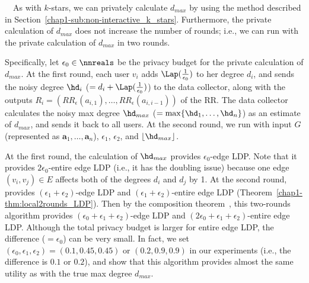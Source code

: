 \smallskip
{}~~As with $k$-stars, we can privately calculate $d_{max}$ 
by using the method described in Section~\ref{chap1-sub:non-interactive_k_stars}. 
Furthermore, the private calculation of $d_{max}$ does not increase the number of rounds; i.e., we can run  with the private calculation of $d_{max}$ in two rounds. 

Specifically, let $\epsilon_0 \in \nnreals$ be the privacy budget for the private calculation of $d_{max}$. 
At the first round, each user $v_i$ adds $\Lap(\frac{1}{\epsilon_0})$ to her degree $d_i$, 
and sends the noisy degree $\hd_i$ ($=d_i + \Lap(\frac{1}{\epsilon_0})$) to the data collector, along with the outputs $R_i = (RR_\epsilon(a_{i,1}), \ldots, RR_\epsilon(a_{i,i-1}))$ of the RR. 
The data collector calculates the noisy max degree $\hd_{max}$ ($= \max\{\hd_1,
\ldots, \hd_n\}$) as an estimate of $d_{max}$, and sends it back to all users. 
At the second round, we run  with input $G$ (represented as $\textbf{a}_1, \ldots, \textbf{a}_n$), $\epsilon_1$, $\epsilon_2$, and $\lfloor \hd_{max} \rfloor$. 


At the first round, the calculation of $\hd_{max}$ provides $\epsilon_0$-edge LDP. 
Note that it provides $2\epsilon_0$-entire edge LDP (i.e., it has the doubling issue) because one edge $(v_i,v_j) \in E$ affects both of the degrees $d_i$ and $d_j$ by 1. 
At the second round,  provides $(\epsilon_1 + \epsilon_2)$-edge LDP and 
$(\epsilon_1 + \epsilon_2)$-entire edge LDP (Theorem~\ref{chap1-thm:local2rounds_LDP}). 
Then by the composition theorem~\cite{DP}, this two-rounds algorithm provides $(\epsilon_0 + \epsilon_1 + \epsilon_2)$-edge LDP and $(2\epsilon_0 + \epsilon_1 + \epsilon_2)$-entire edge LDP. 
Although the total privacy budget is larger for entire edge LDP, the difference ($=\epsilon_0$) can be very small. 
In fact, we set $(\epsilon_0, \epsilon_1, \epsilon_2) = (0.1, 0.45, 0.45)$ or $(0.2, 0.9, 0.9)$ in our experiments (i.e., the difference is $0.1$ or $0.2$), and show that this algorithm provides almost the same utility as  with the true max degree $d_{max}$. 

